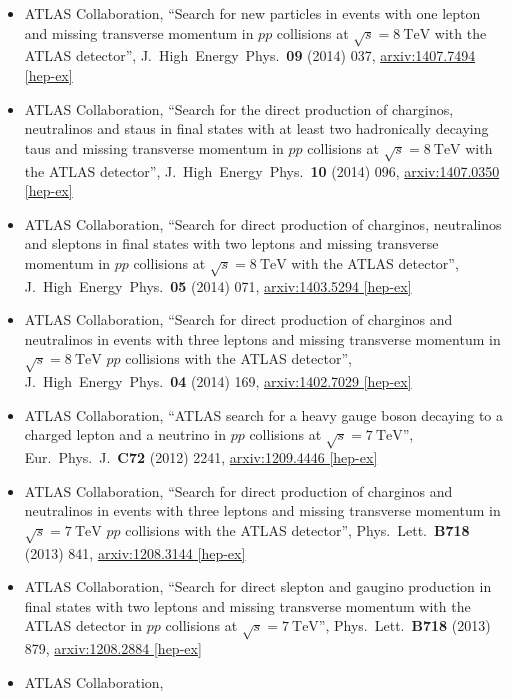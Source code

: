 \documentclass[a4paper,10pt]{article}
\begin{document}
\begin{itemize}
	\item ATLAS Collaboration,
	``Search for new particles in events with one lepton and missing transverse momentum in $pp$ collisions at $\sqrt{s} = 8\ \mathrm{TeV}$ with the ATLAS detector'',
	J.\ High\ Energy\ Phys.\ {\bf 09} (2014) 037,
	\href{http://arxiv.org/abs/1407.7494}{arxiv:1407.7494 [hep-ex]}
	\item ATLAS Collaboration, 
	``Search for the direct production of charginos, neutralinos and staus in final states with at least two hadronically decaying taus and missing transverse momentum in $pp$ collisions at $\sqrt{s} = 8\ \mathrm{TeV}$ with the ATLAS detector'',
	J.\ High\ Energy\ Phys.\ {\bf 10} (2014) 096,
	\href{http://arxiv.org/abs/1407.0350}{arxiv:1407.0350 [hep-ex]}
	\item ATLAS Collaboration, 
	``Search for direct production of charginos, neutralinos and sleptons in final states with two leptons and missing transverse momentum in $pp$ collisions at 
	$\sqrt{s} = 8\ \mathrm{TeV}$ with the ATLAS detector'', 
	J.\ High\ Energy\ Phys.\ {\bf 05} (2014) 071, 
	\href{http://arxiv.org/abs/1403.5294}{arxiv:1403.5294 [hep-ex]}
	\item ATLAS Collaboration, 
	``Search for direct production of charginos and neutralinos in events with three leptons and missing transverse momentum in $\sqrt{s} = 8\ \mathrm{TeV}$ $pp$ collisions with the ATLAS detector'',
	J.\ High\ Energy\ Phys.\ {\bf 04} (2014) 169,
	\href{http://arxiv.org/abs/1402.7029}{arxiv:1402.7029 [hep-ex]}
	\item ATLAS Collaboration,
	``ATLAS search for a heavy gauge boson decaying to a charged lepton and a neutrino in $pp$ collisions at $\sqrt{s} = 7\ \mathrm{TeV}$'',
	Eur.\ Phys.\ J.\ {\bf C72} (2012) 2241,
	\href{http://arxiv.org/abs/1209.4446}{arxiv:1209.4446 [hep-ex]}
	\item ATLAS Collaboration,
	``Search for direct production of charginos and neutralinos in events with three leptons and missing transverse momentum in $\sqrt{s} = 7\ \mathrm{TeV}$ $pp$ collisions with the ATLAS detector'', 
	Phys.\ Lett.\ {\bf B718} (2013) 841, 
	\href{http://arxiv.org/abs/1208.3144}{arxiv:1208.3144 [hep-ex]}
	\item ATLAS Collaboration,
	``Search for direct slepton and gaugino production in final states with two leptons and missing transverse momentum with the ATLAS detector in $pp$ collisions at $\sqrt{s} = 7\ \mathrm{TeV}$'', 
	Phys.\ Lett.\ {\bf B718} (2013) 879, \href{http://arxiv.org/abs/1208.2884}{arxiv:1208.2884 [hep-ex]}
	\item ATLAS Collaboration,

\end{itemize}
\end{document}
